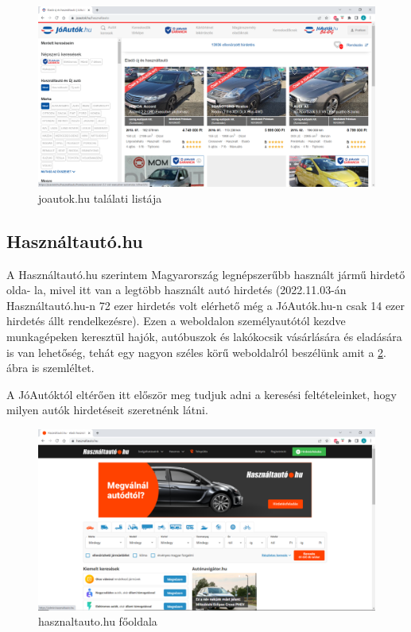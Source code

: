 \begin{figure}[h]
\centering
\includegraphics[scale=0.8]{images/joautok.png}
\caption{joautok.hu találati listája \cite{JoAuto}}
\label{fig:joautok}
\end{figure}

\subsection{Használtautó.hu}

A Használtautó.hu szerintem Magyarország legnépszerűbb használt jármű hirdető olda-
la, mivel itt van a legtöbb használt autó hirdetés (2022.11.03-án Használtautó.hu-n 72 ezer hirdetés volt elérhető még a JóAutók.hu-n csak 14 ezer hirdetés állt rendelkezésre). Ezen a weboldalon személyautótól kezdve munkagépeken keresztül hajók, autóbuszok és lakókocsik vásárlására és eladására is van lehetőség, tehát egy nagyon széles körű weboldalról beszélünk amit a \ref{fig:hasznaltauto}. ábra is szemléltet.

A JóAutóktól eltérően itt először meg tudjuk adni a keresési feltételeinket, hogy milyen autók hirdetéseit szeretnénk látni.

\begin{figure}[h]
\centering
\includegraphics[scale=0.8]{images/hasznaltauto.png}
\caption{hasznaltauto.hu főoldala \cite{Hasznaltauto}}
\label{fig:hasznaltauto}
\end{figure}
\newpage


